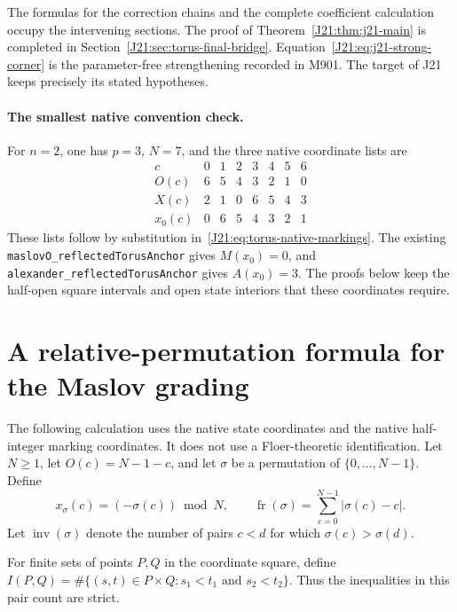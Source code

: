 \documentclass[11pt,oneside]{report}
\theoremstyle{definition}
\numberwithin{equation}{section}
\newcommand{\decl}[1]{\textnormal{\nolinkurl{#1}}}
\begin{document}
The formulas for the correction chains and the complete coefficient
calculation occupy the intervening sections. The proof of
Theorem~\ref{J21:thm:j21-main} is completed in
Section~\ref{J21:sec:torus-final-bridge}. Equation~\eqref{J21:eq:j21-strong-corner}
is the parameter-free strengthening recorded in M901. The target of J21
keeps precisely its stated hypotheses.

\paragraph{The smallest native convention check.}
For $n=2$, one has $p=3$, $N=7$, and the three native coordinate lists are
\[
\begin{array}{c|rrrrrrr}
 c&0&1&2&3&4&5&6\\\hline
 O(c)&6&5&4&3&2&1&0\\
 X(c)&2&1&0&6&5&4&3\\
 x_0(c)&0&6&5&4&3&2&1
\end{array}
\]
These lists follow by substitution in~\eqref{J21:eq:torus-native-markings}.
The existing \decl{maslovO_reflectedTorusAnchor} gives $M(x_0)=0$,
and \decl{alexander_reflectedTorusAnchor} gives $A(x_0)=3$.
The proofs below keep the half-open square intervals and open state
interiors that these coordinates require.



\section{A relative-permutation formula for the Maslov grading}
\label{J21:sec:relative-permutation-maslov}

The following calculation uses the native state coordinates and the native
half-integer marking coordinates. It does not use a Floer-theoretic
identification. Let $N\geq 1$, let $O(c)=N-1-c$, and let $\sigma$ be a
permutation of $\{0,\ldots,N-1\}$. Define
\[
 x_\sigma(c)=(-\sigma(c))\bmod N,
 \qquad
 \operatorname{fr}(\sigma)=\sum_{c=0}^{N-1}|\sigma(c)-c|.
\]
Let $\operatorname{inv}(\sigma)$ denote the number of pairs $c<d$ for which
$\sigma(c)>\sigma(d)$.

For finite sets of points $P,Q$ in the coordinate square, define
$I(P,Q)=\#\{(s,t)\in P\times Q:s_1<t_1\text{ and }s_2<t_2\}$.
Thus the inequalities in this pair count are strict.
\end{document}
